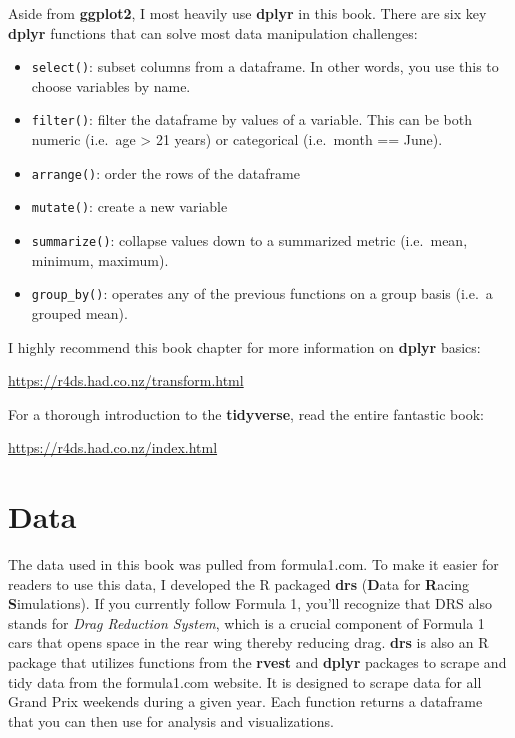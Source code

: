 \documentclass[
]{book}
\providecommand{\tightlist}{%
  \setlength{\itemsep}{0pt}\setlength{\parskip}{0pt}}
\begin{document}
Aside from \textbf{ggplot2}, I most heavily use \textbf{dplyr} in this book. There are six key \textbf{dplyr} functions that can solve most data manipulation challenges:

\begin{itemize}
\tightlist
\item
  \texttt{select()}: subset columns from a dataframe. In other words, you use this to choose variables by name.
\item
  \texttt{filter()}: filter the dataframe by values of a variable. This can be both numeric (i.e.~age \textgreater{} 21 years) or categorical (i.e.~month == June).
\item
  \texttt{arrange()}: order the rows of the dataframe
\item
  \texttt{mutate()}: create a new variable
\item
  \texttt{summarize()}: collapse values down to a summarized metric (i.e.~mean, minimum, maximum).
\item
  \texttt{group\_by()}: operates any of the previous functions on a group basis (i.e.~a grouped mean).
\end{itemize}

I highly recommend this book chapter for more information on \textbf{dplyr} basics:

\url{https://r4ds.had.co.nz/transform.html}

For a thorough introduction to the \textbf{tidyverse}, read the entire fantastic book:

\url{https://r4ds.had.co.nz/index.html}

\hypertarget{data}{%
\section{Data}\label{data}}

The data used in this book was pulled from formula1.com. To make it easier for readers to use this data, I developed the R packaged \textbf{drs} (\textbf{D}ata for \textbf{R}acing \textbf{S}imulations). If you currently follow Formula 1, you'll recognize that DRS also stands for \emph{Drag Reduction System}, which is a crucial component of Formula 1 cars that opens space in the rear wing thereby reducing drag. \textbf{drs} is also an R package that utilizes functions from the \textbf{rvest} and \textbf{dplyr} packages to scrape and tidy data from the formula1.com website. It is designed to scrape data for all Grand Prix weekends during a given year. Each function returns a dataframe that you can then use for analysis and visualizations.
\end{document}
